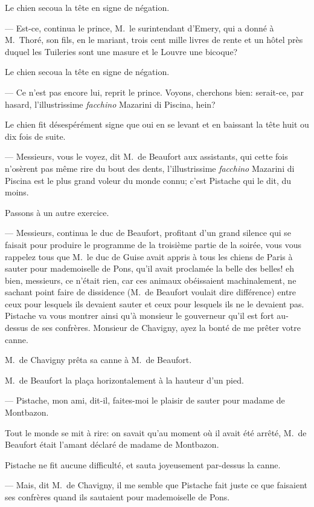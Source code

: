 Le chien secoua la tête en signe de négation.

— Est-ce, continua le prince, M.~le surintendant d'Emery, qui a donné à M.~Thoré, son fils, en le mariant, trois cent mille livres de rente et un hôtel près duquel les Tuileries sont une masure et le Louvre une bicoque?

Le chien secoua la tête en signe de négation.

— Ce n'est pas encore lui, reprit le prince. Voyons, cherchons bien: serait-ce, par hasard, l'illustrissime \textit{facchino} Mazarini di Piscina, hein?

Le chien fit désespérément signe que oui en se levant et en baissant la tête huit ou dix fois de suite.

— Messieurs, vous le voyez, dit M.~de Beaufort aux assistants, qui cette fois n'osèrent pas même rire du bout des dents, l'illustrissime \textit{facchino} Mazarini di Piscina est le plus grand voleur du monde connu; c'est Pistache qui le dit, du moins.

Passons à un autre exercice.

— Messieurs, continua le duc de Beaufort, profitant d'un grand silence qui se faisait pour produire le programme de la troisième partie de la soirée, vous vous rappelez tous que M.~le duc de Guise avait appris à tous les chiens de Paris à sauter pour mademoiselle de Pons, qu'il avait proclamée la belle des belles! eh bien, messieurs, ce n'était rien, car ces animaux obéissaient machinalement, ne sachant point faire de dissidence (M.~de Beaufort voulait dire différence) entre ceux pour lesquels ils devaient sauter et ceux pour lesquels ils ne le devaient pas. Pistache va vous montrer ainsi qu'à monsieur le gouverneur qu'il est fort au-dessus de ses confrères. Monsieur de Chavigny, ayez la bonté de me prêter votre canne.

M.~de Chavigny prêta sa canne à M.~de Beaufort.

M.~de Beaufort la plaça horizontalement à la hauteur d'un pied.

— Pistache, mon ami, dit-il, faites-moi le plaisir de sauter pour madame de Montbazon.

Tout le monde se mit à rire: on savait qu'au moment où il avait été arrêté, M.~de Beaufort était l'amant déclaré de madame de Montbazon.

Pistache ne fit aucune difficulté, et sauta joyeusement par-dessus la canne.

— Mais, dit M.~de Chavigny, il me semble que Pistache fait juste ce que faisaient ses confrères quand ils sautaient pour mademoiselle de Pons.

